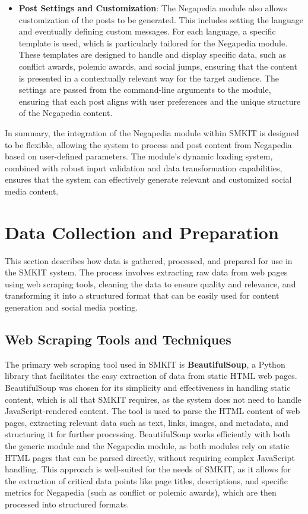 \begin{itemize}
    \item \textbf{Post Settings and Customization}: The Negapedia module also allows customization of the posts to be generated. This includes setting the language and eventually defining custom messages. For each language, a specific template is used, which is particularly tailored for the Negapedia module. These templates are designed to handle and display specific data, such as conflict awards, polemic awards, and social jumps, ensuring that the content is presented in a contextually relevant way for the target audience. The settings are passed from the command-line arguments to the module, ensuring that each post aligns with user preferences and the unique structure of the Negapedia content.
\end{itemize}

In summary, the integration of the Negapedia module within SMKIT is designed to be flexible, allowing the system to process and post content from Negapedia based on user-defined parameters. The module's dynamic loading system, combined with robust input validation and data transformation capabilities, ensures that the system can effectively generate relevant and customized social media content.

\section{Data Collection and Preparation}
\label{sec:data_collection_preparation}
This section describes how data is gathered, processed, and prepared for use in the SMKIT system. The process involves extracting raw data from web pages using web scraping tools, cleaning the data to ensure quality and relevance, and transforming it into a structured format that can be easily used for content generation and social media posting.

\subsection{Web Scraping Tools and Techniques}
\label{subsec:web_scraping_tools_techniques}
The primary web scraping tool used in SMKIT is \textbf{BeautifulSoup}, a Python library that facilitates the easy extraction of data from static HTML web pages. BeautifulSoup was chosen for its simplicity and effectiveness in handling static content, which is all that SMKIT requires, as the system does not need to handle JavaScript-rendered content.
The tool is used to parse the HTML content of web pages, extracting relevant data such as text, links, images, and metadata, and structuring it for further processing. BeautifulSoup works efficiently with both the generic module and the Negapedia module, as both modules rely on static HTML pages that can be parsed directly, without requiring complex JavaScript handling.
This approach is well-suited for the needs of SMKIT, as it allows for the extraction of critical data points like page titles, descriptions, and specific metrics for Negapedia (such as conflict or polemic awards), which are then processed into structured formats.

